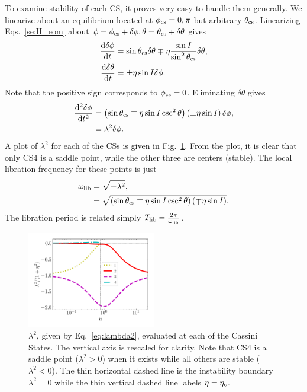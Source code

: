 \documentclass[
        fleqn,
        usenatbib,
    ]{mnras}
\newcommand*{\rd}[2]{\frac{\mathrm{d}#1}{\mathrm{d}#2}}
\newcommand*{\rtd}[2]{\frac{\mathrm{d}^2#1}{\mathrm{d}#2^2}}
\newcommand*{\p}[1]{\left(#1\right)}
\begin{document}
To examine stability of each CS, it proves very easy to handle them generally.
We linearize about an equilibrium located at $\phi_{\rm cs} = 0, \pi$ but
arbitrary $\theta_{\rm cs}$. Linearizing Eqs.~\eqref{se:H_eom} about $\phi =
\phi_{\rm cs} + \delta \phi, \theta = \theta_{\rm cs} + \delta \theta$ gives
\begin{subequations}\label{se:H_eom_lin}
    \begin{align}
        \rd{\delta \phi}{t} &= \sin \theta_{\rm cs} \delta \theta
            \mp \eta \frac{\sin I}{\sin^2\theta_{\rm cs}} \delta \theta,\\
        \rd{\delta \theta}{t} &= \pm \eta \sin I \delta \phi.
    \end{align}
\end{subequations}
Note that the positive sign corresponds to $\phi_{\rm cs} = 0$. Eliminating
$\delta \theta$ gives
\begin{align}
    \rtd{\delta \phi}{t} &= \p{\sin \theta_{\rm cs}
        \mp \eta \sin I\csc^2\theta}\p{\pm \eta \sin I} \delta
            \phi,\\
        &\equiv \lambda^2\delta \phi.\label{eq:lambda2}
\end{align}
A plot of $\lambda^2$ for each of the CSs is given in Fig.~\ref{fig:lambda2}.
From the plot, it is clear that only CS4 is a saddle point, while the other
three are centers (stable). The local libration frequency for these points is
just
\begin{align}
    \omega_{\rm lib} &= \sqrt{-\lambda^2},\\
        &= \sqrt{\p{\sin \theta_{\rm cs}
            \mp \eta \sin I \csc^2\theta}\p{\mp \eta \sin I}}.
\end{align}
The libration period is related simply $T_{\rm lib} = \frac{2\pi}{\omega_{\rm
lib}}$.
\begin{figure}
    \centering
    \includegraphics[width=0.5\textwidth]{plots_diskdisp/2_lambdas.png}
    \caption{$\lambda^2$, given by Eq.~\eqref{eq:lambda2}, evaluated at each of
    the Cassini States. The vertical axis is rescaled for clarity. Note that CS4
    is a saddle point ($\lambda^2 > 0$) when it exists while all others are
    stable ($\lambda^2 < 0$). The thin horizontal dashed line is the instability
    boundary $\lambda^2 = 0$ while the thin vertical dashed line labels $\eta =
    \eta_{\rm c}$.}\label{fig:lambda2}
\end{figure}
\end{document}
